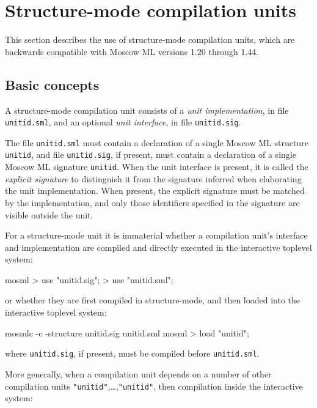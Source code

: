 \documentclass[fleqn,a4paper]{article}
\begin{document}
\newpage

\section{Structure-mode compilation units}
\label{sec-structure-mode}

This section describes the use of structure-mode compilation units,
which are backwards compatible with Moscow ML versions 1.20 through
1.44.


\subsection{Basic concepts}

A structure-mode compilation unit consists of a {\em unit
  implementation}, in file \texttt{unitid.sml}, and an optional {\em
  unit interface}, in file \texttt{unitid.sig}\@.  

The file \texttt{unitid.sml} must contain a declaration of a single
Moscow ML structure \texttt{unitid}, and file \texttt{unitid.sig}, if
present, must contain a declaration of a single Moscow ML signature
\texttt{unitid}.  When the unit interface is present, it is called the
{\em explicit signature\/} to distinguish it from the signature
inferred when elaborating the unit implementation.  When present, the
explicit signature must be matched by the implementation, and only
those identifiers specified in the signature are visible outside the
unit.

For a structure-mode unit it is immaterial whether a compilation
unit's interface and implementation are compiled and directly executed
in the interactive toplevel system:

\begin{program}
mosml
> use "unitid.sig";
> use "unitid.sml";
\end{program}

\noindent 
or whether they are first compiled in structure-mode, and then loaded
into the interactive toplevel system:

\begin{program}
mosmlc -c -structure unitid.sig unitid.sml 
mosml
> load "unitid";
\end{program}

\noindent where \texttt{unitid.sig}, if present, must be compiled
before \texttt{unitid.sml}.

More generally, when a compilation unit depends on a number of other
compilation units \texttt{"unitid\et"},\ldots,\texttt{"unitid\n"},
then compilation inside the interactive system:
\end{document}
